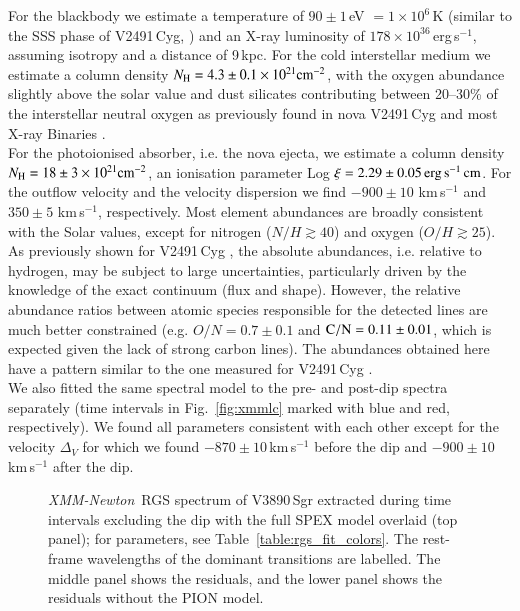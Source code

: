 \documentclass{aa}
\newcommand{\xmm}{{\it XMM-Newton}}
\begin{document}
For the blackbody we estimate a temperature of $90 \pm 1$\,eV $=1\times 10^6$\,K
(similar to the SSS phase of V2491\,Cyg, \citealt{pinto12}) and an X-ray luminosity of
$178 \times 10^{36}$\,erg\,s$^{-1}$, assuming isotropy and a distance of 9\,kpc.
For the cold interstellar medium we estimate a column density
$N_{\rm H} = 4.3 \pm 0.1 \times 10^{21} {\rm cm}^{-2}$, with the oxygen abundance slightly
above the solar value and dust silicates contributing between 20--30\% of
the interstellar neutral oxygen as previously found in nova V2491\,Cyg and most X-ray Binaries
\citep{pinto12,Pinto2013}.\\

For the photoionised absorber, i.e. the nova ejecta, we estimate a column density
$N_{\rm H} = 18 \pm 3 \times 10^{21} {\rm cm}^{-2}$, an ionisation parameter
Log $\xi = 2.29 \pm 0.05\,{\rm erg\,s^{-1} \, cm}$. For the outflow velocity and the velocity
dispersion we find $-900 \pm 10$ km\,s$^{-1}$ and $350 \pm 5$ km\,s$^{-1}$, respectively.
Most element abundances
are broadly consistent with the Solar values, except for nitrogen ($N/H\gtrsim40$) and oxygen
($O/H\gtrsim25$). As previously shown for V2491\,Cyg \citep{pinto12}, the absolute abundances,
i.e. relative to hydrogen, may be subject to large uncertainties, particularly driven by the
knowledge of the exact continuum (flux and shape). However, the relative abundance ratios between
atomic species responsible for the detected lines are much better constrained
(e.g. $O/N=0.7\pm0.1$ and ${\rm C/N}=0.11 \pm 0.01$, which is expected given the lack of
strong carbon lines). The abundances obtained here have a pattern similar to the one
measured for V2491\,Cyg \citep{pinto12}.\\

We also fitted the same spectral model to the pre- and post-dip spectra separately
(time intervals in Fig.~\ref{fig:xmmlc} marked with blue and red, respectively).
We found all parameters consistent with each other except for the velocity $\Delta_V$ for
which we found $-870\pm10$\,km\,s$^{-1}$ before the dip and $-900\pm10$\,km\,s$^{-1}$
after the dip.\\


\begin{figure*}[!ht]
\caption{\label{fig:spex_fit}
\xmm\ RGS spectrum of V3890\,Sgr extracted
 during time intervals excluding the dip with the full SPEX model overlaid
 (top panel); for parameters, see Table~\ref{table:rgs_fit_colors}.
The rest-frame wavelengths of the dominant transitions are labelled.
 The middle panel shows the residuals, and the lower panel shows
the residuals without the {\scriptsize{PION}} model.}
\end{figure*}
\end{document}
